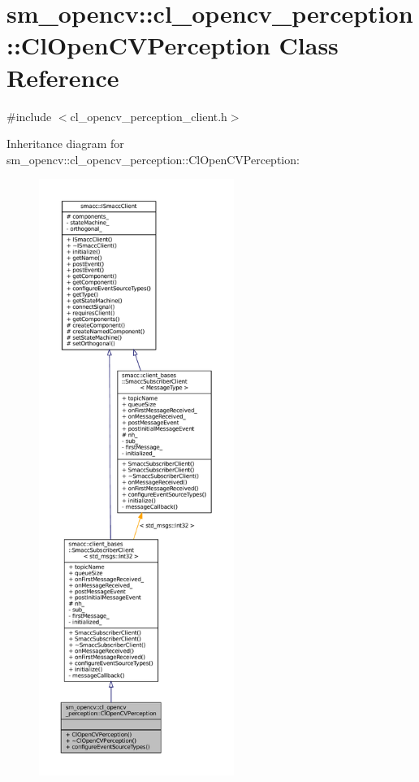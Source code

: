 \hypertarget{classsm__opencv_1_1cl__opencv__perception_1_1ClOpenCVPerception}{}\section{sm\+\_\+opencv\+:\+:cl\+\_\+opencv\+\_\+perception\+:\+:Cl\+Open\+C\+V\+Perception Class Reference}
\label{classsm__opencv_1_1cl__opencv__perception_1_1ClOpenCVPerception}


{\ttfamily \#include $<$cl\+\_\+opencv\+\_\+perception\+\_\+client.\+h$>$}



Inheritance diagram for sm\+\_\+opencv\+:\+:cl\+\_\+opencv\+\_\+perception\+:\+:Cl\+Open\+C\+V\+Perception\+:
\nopagebreak
\begin{figure}[H]
\begin{center}
\leavevmode
\includegraphics[height=550pt]{classsm__opencv_1_1cl__opencv__perception_1_1ClOpenCVPerception__inherit__graph}
\end{center}
\end{figure}


